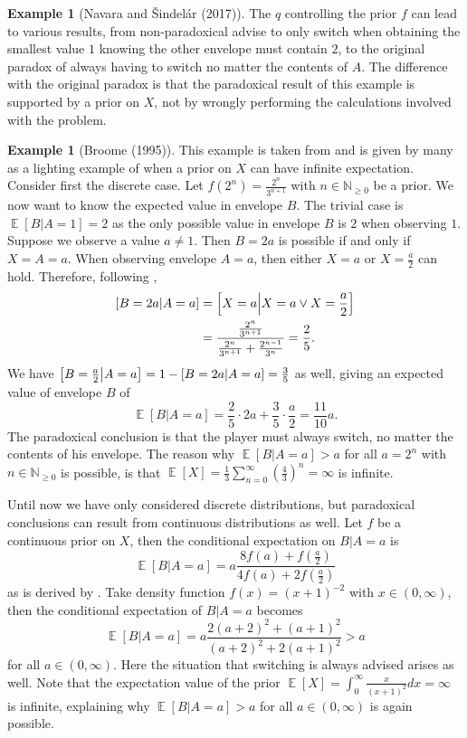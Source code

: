 \documentclass[a4paper]{report}
\theoremstyle{plain}
\theoremstyle{definition}
\newtheorem{example}[theorem]{Example}
\theoremstyle{remark}
\numberwithin{equation}{chapter}
\newcommand{\N}{\mathbb{N}}
\let\P\relax
\DeclareMathOperator{\P}{\mathbb{P}}
\DeclareMathOperator{\E}{\mathbb{E}}
\DeclareMathOperator{\1}{\mathbbm{1}}
\begin{document}
\begin{example}[Navara and Šindelár (2017)]
The $q$ controlling the prior $f$ can lead to various results, from non-paradoxical advise to only switch when obtaining the smallest value $1$ knowing the other envelope must contain $2$, to the original paradox of always having to switch no matter the contents of $A$. The difference with the original paradox is that the paradoxical result of this example is supported by a prior on $X$, not by wrongly performing the calculations involved with the problem.
\end{example}

\begin{example}[Broome (1995)]
This example is taken from \cite{Broome95} and is given by many as a lighting example of when a prior on $X$ can have infinite expectation. Consider first the discrete case. Let $f(2^n)=\frac{2^n}{3^{n+1}}$ with $n\in\N_{\geq 0}$ be a prior. We now want to know the expected value in envelope $B$. The trivial case is $\E[B|A=1]=2$ as the only possible value in envelope $B$ is $2$ when observing $1$.\\
Suppose we observe a value $a\neq1$. Then $B=2a$ is possible if and only if $X=A=a$. When observing envelope $A=a$, then either $X=a$ or $X=\frac{a}{2}$ can hold. Therefore, following \cite{Broome95},
\begin{align}
\P[B=2a|A=a]&=\P\left[X=a\middle|X=a\lor X=\frac{a}{2}\right]\\
&=\frac{\frac{2^n}{3^{n+1}}}{\frac{2^n}{3^{n+1}}+\frac{2^{n-1}}{3^{n}}}=\frac{2}{5}.
\end{align}
We have $\P\left[B=\frac{a}{2}\middle|A=a\right]=1-\P[B=2a|A=a]=\frac{3}{5}$ as well, giving an expected value of envelope $B$ of
\begin{equation}
\E[B|A=a]=\frac{2}{5}\cdot2a+\frac{3}{5}\cdot\frac{a}{2}=\frac{11}{10}a.
\end{equation}
The paradoxical conclusion is that the player must always switch, no matter the contents of his envelope. The reason why $\E[B|A=a]>a$ for all $a=2^n$ with $n\in\N_{\geq0}$ is possible, is that $\E[X]=\frac{1}{3}\sum_{n=0}^\infty\left(\frac{4}{3}\right)^n=\infty$ is infinite.

Until now we have only considered discrete distributions, but paradoxical conclusions can result from continuous distributions as well. Let $f$ be a continuous prior on $X$, then the conditional expectation on $B|A=a$ is
\begin{equation}
\E[B|A=a]=a\frac{8f(a)+f\left(\frac{a}{2}\right)}{4f(a)+2f\left(\frac{a}{2}\right)}
\end{equation}
as is derived by \cite{Broome95}. Take density function $f(x)=(x+1)^{-2}$ with $x\in(0,\infty)$, then the conditional expectation of $B|A=a$ becomes
\begin{equation}
\E[B|A=a]=a\frac{2(a+2)^2+(a+1)^2}{(a+2)^2+2(a+1)^2}>a
\end{equation}
for all $a\in(0,\infty)$. Here the situation that switching is always advised arises as well. Note that the expectation value of the prior $\E[X]=\int_0^\infty \frac{x}{(x+1)^2}dx=\infty$ is infinite, explaining why $\E[B|A=a]>a$ for all $a\in(0,\infty)$ is again possible.
\end{example}
\end{document}
